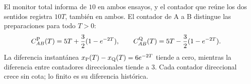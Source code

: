 El monitor total informa de \(10\) en ambos ensayos, y el contador que reúne los dos sentidos registra \(10T\), también en ambos. El contador de A a B distingue las preparaciones para todo \(T>0\):
\[
C_{AB}^{\rm P}(T)=5T+\frac32(1-e^{-2T}),\qquad
C_{AB}^{\rm Q}(T)=5T-\frac32(1-e^{-2T}).
\]
La diferencia instantánea \(x_{\rm P}(T)-x_{\rm Q}(T)=6e^{-2T}\) tiende a cero, mientras la diferencia entre contadores direccionales tiende a \(3\). Cada contador direccional crece sin cota; lo finito es su diferencia histórica.
